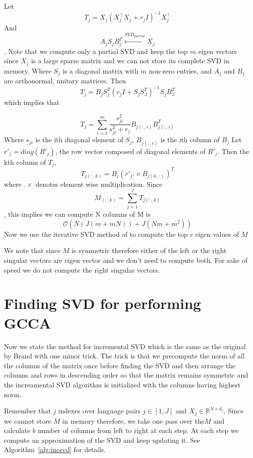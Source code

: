 \documentclass[11pt]{article}
\begin{document}
Let $$T_{j} = X_j(X_j^\top X_j+r_jI)^{-1}X_j^\top$$
And $$ A_{j} S_{j} B^T_{j} \xleftarrow{SVD_{partial}} X_j$$.
Note that we compute only a partial SVD and keep the top $m$ eigen
vectors since $X_j$ is a large sparse matrix and we can not store its
complete SVD in memory.
Where $S_j$ is a diagonal matrix with $m$ non-zero entries, 
and $A_j$ and $B_j$ are orthonormal, unitary matrices.
Then $$T_j = B_j S_j^T(r_j I + S_j S_J^T)^{-1}S_j B_J^T$$ which
implies that 


$$T_j = \sum_{i=1}^m \frac{s_{ji}^2}{s_{ji}^2+r_j} B_{j(:,i)}B_{j(:,i)}^T$$
Where $s_{ji}$ is the ith diagonal element of $S_j$, $B_{j(:,i)}$ is the
ith column of $B_{j}$
Let $r'_j = diag(R'_j)$, the row vector composed of diagonal elements
of $R'_j$. Then the kth column of $T_j$,
$$T_{j (:,k)} = B_j (r'_j .\times B_{j(k,:)})^T$$
where $.\times$ denotes element wise multiplication.
Since $$M_{(:,k)} = \sum_{j=1}^J T_{j (:,k)}$$, this implies we can
compute N columns of M is $$\mathcal{O}(N(J(m+mN)) + J(Nm + m^2))$$
Now we use the iterative SVD method of \cite{brand2002incremental} to
compute the top $r$ eigen values of $M$

We note that since $M$ is
symmetric therefore either of the left or the right
singular vectors are eigen vector and we don't need to compute
both. For sake of speed we do not compute the right
singular vectors.

\section{Finding SVD for performing GCCA}
\label{sec:rgcca}
Now we state the method for incremental SVD which is the same as the
original by Brand with one minor trick. The trick is that we
precompute the norm of 
all the columns of the matrix once before finding the SVD and then
arrange the columns and rows in descending order so that the matrix
remains symmetric and the increamental SVD algorithm is initialized
with the columns having highest norm.

Remember that $j$ indexes over language pairs $j \in [1, J]$ and $ X_j \in \mathbb{R}^{N\times d_j}$.
Since we cannot store $M$ in memory therefore, we take one pass over
the$M$ and calculate $b$ number of columns from left to right at each
step. At each step we compute an approximation of the SVD and keep
updating it. See Algorithm~\ref{alg:incsvd} for details.
\end{document}
